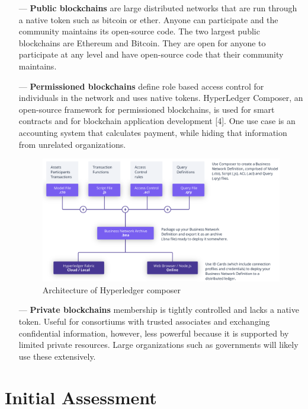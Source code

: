 \documentclass[12pt]{scrreprt}
\begin{document}
\begin{appendices}
\begin{itemize}
	\item[---] \textbf{Public blockchains} are large distributed networks that are run through a native token such as bitcoin or ether. Anyone can participate and the community maintains its open-source code. The two largest public blockchains are Ethereum and Bitcoin. They are open for anyone to participate at any level and have open-source code that their community maintains.
	\item[---] \textbf{Permissioned blockchains} define role based access control for individuals in the network and uses native tokens.  HyperLedger Composer, an open-source framework for permissioned blockchains, is used for smart contracts and for blockchain application development [4]. One use case is an accounting system that calculates payment, while hiding that information from unrelated organizations.  \hfill \break %
	\begin{figure}[ht]
	\includegraphics[width=1\linewidth]{composer-arch.png}
	\caption{Architecture of Hyperledger composer}
	\end{figure}
	\item[---] \textbf{Private blockchains}  membership is tightly controlled and lacks a native token. Useful for consortiums with trusted associates and exchanging confidential information, however, less powerful because it is supported by limited private resources. Large organizations such as governments will likely use these extensively.
\end{itemize}

\newpage 
\section{Initial Assessment}


\end{appendices}
\end{document}
